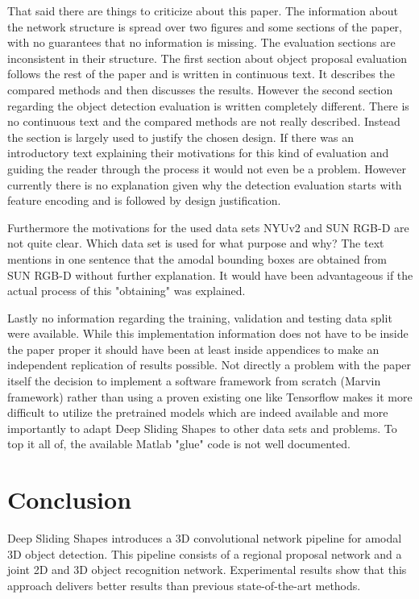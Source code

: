 \documentclass[12pt]{scrartcl}
\begin{document}
That said there are things to criticize about this paper. The information about
the network structure is spread over two figures and some sections of the paper,
with no guarantees that no information is missing. The evaluation sections are
inconsistent in their structure. The first section about object proposal evaluation
follows the rest of the paper and is written in continuous text. It describes the
compared methods and then discusses the results. However the second section regarding
the object detection evaluation is written completely different. There is no
continuous text and the compared methods are not really described. Instead the
section is largely used to justify the chosen design. If there was an introductory
text explaining their motivations for this kind of evaluation and guiding the reader
through the process it would not even be a problem. However currently there
is no explanation given why the detection evaluation starts with feature encoding
and is followed by design justification.

Furthermore the motivations for the used data sets NYUv2 and SUN RGB-D are
not quite clear. Which data set is used for what purpose and why? The text
mentions in one sentence that the amodal bounding boxes are obtained from
SUN RGB-D without further explanation. It would have been advantageous
if the actual process of this "obtaining" was explained.

Lastly no information regarding the training, validation and testing data split were
available. While this implementation information does not have to be inside the
paper proper it should have been at least inside appendices to make an independent
replication of results possible. Not directly a problem with the paper itself the decision to
implement a software framework from scratch (Marvin framework) rather than using
a proven existing one like Tensorflow makes it more difficult to utilize the
pretrained models which are indeed available and more importantly to adapt Deep
Sliding Shapes to other data sets and problems. To top it all of, the available
Matlab "glue" code is not well documented.



\section{Conclusion}

Deep Sliding Shapes introduces a 3D convolutional network pipeline for
amodal 3D object detection. This pipeline consists of a regional proposal
network and a joint 2D and 3D object recognition network. Experimental
results show that this approach delivers better results than previous
state-of-the-art methods.
\end{document}
